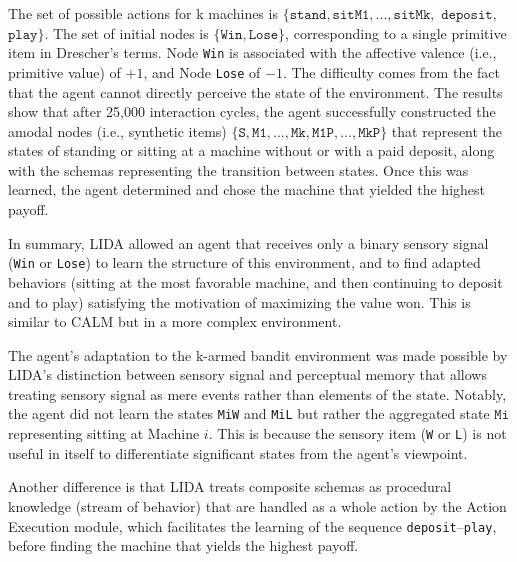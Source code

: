 \documentclass[runningheads]{llncs}
\begin{document}
The set of possible actions for k machines is $\{ \texttt{stand}, \texttt{sitM1},..., \texttt{sitMk},$ $\texttt{deposit},$ $\texttt{play} \}$. 
The set of initial nodes is $\{\texttt{Win}, \texttt{Lose} \}$, corresponding to a single primitive item in Drescher's terms.
Node \texttt{Win} is associated with the affective valence (i.e., primitive value) of $+1$, and Node \texttt{Lose} of $-1$.   
The difficulty comes from the fact that the agent cannot directly perceive the state of the environment.
The results show that after 25,000 interaction cycles, the agent successfully constructed the amodal nodes (i.e., synthetic items) $\{ \texttt{S}, \texttt{M1},  ..., \texttt{Mk}, \texttt{M1P}, ...,  \texttt{MkP} \}$ that represent the states of standing or sitting at a machine without or with a paid deposit, along with the schemas representing the transition between states. 
Once this was learned, the agent determined and chose the machine that yielded the highest payoff.

In summary, LIDA allowed an agent that receives only a binary sensory signal (\texttt{Win} or \texttt{Lose}) to learn the structure of this environment, and to find adapted behaviors (sitting at the most favorable machine, and then continuing to deposit and to play) satisfying the motivation of maximizing the value won. 
This is similar to CALM but in a more complex environment.

The agent's adaptation to the k-armed bandit environment was made possible by LIDA's distinction between sensory signal and perceptual memory that allows treating sensory signal as mere events rather than elements of the state. 
Notably, the agent did not learn the states \texttt{MiW} and \texttt{MiL} but rather the aggregated state $\texttt{Mi}$ representing sitting at Machine $i$.
This is because the sensory item (\texttt{W} or \texttt{L}) is not useful in itself to differentiate significant states from the agent's viewpoint. 

Another difference is that LIDA treats composite schemas as procedural knowledge (stream of behavior) that are handled as a whole action by the Action Execution module, which facilitates the learning of the sequence \texttt{deposit}--\texttt{play}, before finding the machine that yields the highest payoff. 

\end{document}
